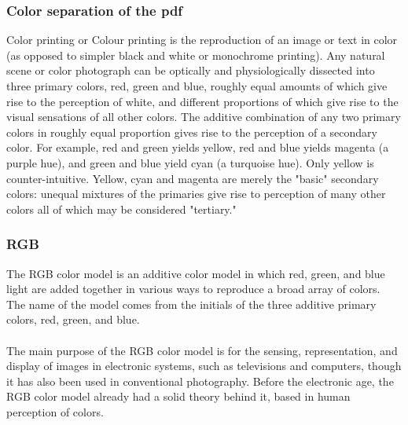 \subsubsection{Color separation of the pdf}
Color printing or Colour printing is the reproduction of an image or text in color (as opposed to simpler black and white or monochrome printing). Any natural scene or color photograph can be optically and physiologically dissected into three primary colors, red, green and blue, roughly equal amounts of which give rise to the perception of white, and different proportions of which give rise to the visual sensations of all other colors. The additive combination of any two primary colors in roughly equal proportion gives rise to the perception of a secondary color. For example, red and green yields yellow, red and blue yields magenta (a purple hue), and green and blue yield cyan (a turquoise hue). Only yellow is counter-intuitive. Yellow, cyan and magenta are merely the "basic" secondary colors: unequal mixtures of the primaries give rise to perception of many other colors all of which may be considered "tertiary."
\subsubsection{RGB}
The RGB color model is an additive color model in which red, green, and blue light are added together in various ways to reproduce a broad array of colors. The name of the model comes from the initials of the three additive primary colors, red, green, and blue.\\\\
The main purpose of the RGB color model is for the sensing, representation, and display of images in electronic systems, such as televisions and computers, though it has also been used in conventional photography. Before the electronic age, the RGB color model already had a solid theory behind it, based in human perception of colors.\\

